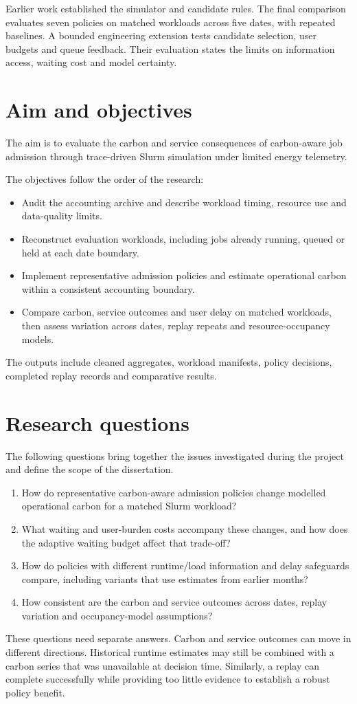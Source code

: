 Earlier work established the simulator and candidate rules. The final comparison evaluates seven policies on matched workloads across five dates, with repeated baselines. A bounded engineering extension tests candidate selection, user budgets and queue feedback. Their evaluation states the limits on information access, waiting cost and model certainty.

\section{Aim and objectives}
The aim is to evaluate the carbon and service consequences of carbon-aware job admission through trace-driven Slurm simulation under limited energy telemetry.

The objectives follow the order of the research:
\begin{itemize}
\item Audit the accounting archive and describe workload timing, resource use and data-quality limits.
\item Reconstruct evaluation workloads, including jobs already running, queued or held at each date boundary.
\item Implement representative admission policies and estimate operational carbon within a consistent accounting boundary.
\item Compare carbon, service outcomes and user delay on matched workloads, then assess variation across dates, replay repeats and resource-occupancy models.
\end{itemize}
The outputs include cleaned aggregates, workload manifests, policy decisions, completed replay records and comparative results.

\section{Research questions}
The following questions bring together the issues investigated during the project and define the scope of the dissertation.
\begin{enumerate}
\item\label{rq:carbon} How do representative carbon-aware admission policies change modelled operational carbon for a matched Slurm workload?
\item\label{rq:service} What waiting and user-burden costs accompany these changes, and how does the adaptive waiting budget affect that trade-off?
\item\label{rq:information} How do policies with different runtime/load information and delay safeguards compare, including variants that use estimates from earlier months?
\item\label{rq:robustness} How consistent are the carbon and service outcomes across dates, replay variation and occupancy-model assumptions?
\end{enumerate}
These questions need separate answers. Carbon and service outcomes can move in different directions. Historical runtime estimates may still be combined with a carbon series that was unavailable at decision time. Similarly, a replay can complete successfully while providing too little evidence to establish a robust policy benefit.


